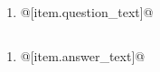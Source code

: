 \documentclass[uplatex,a4j,11pt,landscape]{jsarticle}
\begin{document}
\begin{multicols}{2}
  \begin{minipage}[t][8.1cm][t]{\linewidth}
    \section{}
    \vspace{-3mm}
    \begin{enumerate}
      \item @[item.question\_text]@
    \end{enumerate}
  \end{minipage}
\end{multicols}

\newpage

\setcounter{section}{0}
\begin{multicols}{2}
  \begin{minipage}[t][8.1cm][t]{\linewidth}
    \section{}
    \vspace{-3mm}
    \begin{enumerate}
      \item @[item.answer\_text]@
    \end{enumerate}
  \end{minipage}
\end{multicols}
\end{document}
